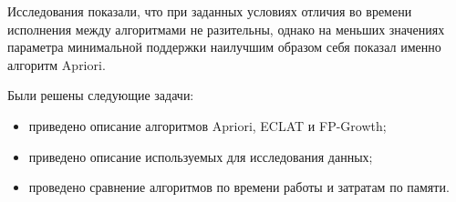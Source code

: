 \documentclass[12pt]{report}
\begin{document}
Исследования показали, что при заданных условиях отличия во времени исполнения между алгоритмами не разительны, однако на меньших значениях параметра минимальной поддержки наилучшим образом себя показал именно алгоритм Apriori.

Были решены следующие задачи:
\begin{itemize}
	\item приведено описание алгоритмов Apriori, ECLAT и FP-Growth;
	\item приведено описание используемых для исследования данных;
	\item проведено сравнение алгоритмов по времени работы и затратам по памяти.
\end{itemize}

\pagebreak

\printbibliography[title={СПИСОК ИСПОЛЬЗОВАННЫХ\\ ИСТОЧНИКОВ}]


\pagebreak
\end{document}
